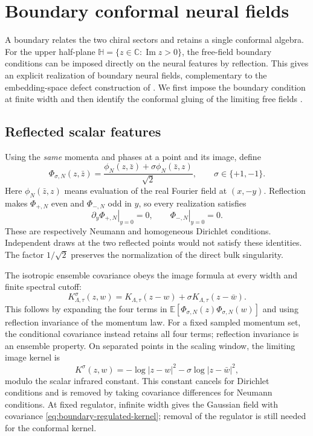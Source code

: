 \section{Boundary conformal neural fields}
\label{sec:boundary}

A boundary relates the two chiral sectors and retains a single conformal
algebra.  For the upper half-plane
$\mathbb H=\{z\in\mathbb C:\operatorname{Im}z>0\}$, the free-field
boundary conditions can be imposed directly on the neural features by
reflection.  This gives an explicit realization of boundary neural fields,
complementary to the embedding-space defect construction of
\cite{Capuozzo:2025ozt}.  We first impose the boundary condition at finite
width and then identify the conformal gluing of the limiting free fields
\cite{Cardy:2004hm}.

\subsection{Reflected scalar features}

Using the \emph{same} momenta and phases at a point and its image, define
\begin{equation}
\Phi_{\sigma,N}(z,\bar z)
=\frac{\phi_N(z,\bar z)+\sigma\phi_N(\bar z,z)}{\sqrt2},
\qquad \sigma\in\{+1,-1\}.
\label{eq:boundary-scalar-features}
\end{equation}
Here $\phi_N(\bar z,z)$ means evaluation of the real Fourier field at
$(x,-y)$.  Reflection makes $\Phi_{+,N}$ even and $\Phi_{-,N}$ odd in
$y$, so every realization satisfies
\begin{equation}
\left.\partial_y\Phi_{+,N}\right|_{y=0}=0,
\qquad
\left.\Phi_{-,N}\right|_{y=0}=0.
\label{eq:boundary-exact-bcs}
\end{equation}
These are respectively Neumann and homogeneous Dirichlet conditions.
Independent draws at the two reflected points would not satisfy these
identities.  The factor $1/\sqrt2$ preserves the normalization of the
direct bulk singularity.

The isotropic ensemble covariance obeys the image formula at every width
and finite spectral cutoff:
\begin{equation}
K^\sigma_{\Lambda,\tau}(z,w)
=K_{\Lambda,\tau}(z-w)
+\sigma K_{\Lambda,\tau}(z-\bar w).
\label{eq:boundary-regulated-kernel}
\end{equation}
This follows by expanding the four terms in
$\mathbb E[\Phi_{\sigma,N}(z)\Phi_{\sigma,N}(w)]$ and using reflection
invariance of the momentum law.  For a fixed sampled momentum set, the
conditional covariance instead retains all four terms; reflection
invariance is an ensemble property.  On separated points in the scaling
window, the limiting image kernel is
\begin{equation}
K^\sigma(z,w)
=-\log|z-w|^2-\sigma\log|z-\bar w|^2,
\label{eq:boundary-log-kernel}
\end{equation}
modulo the scalar infrared constant.  This constant cancels for Dirichlet
conditions and is removed by taking covariance differences for Neumann
conditions.  At fixed regulator, infinite width gives the Gaussian field
with covariance \eqref{eq:boundary-regulated-kernel}; removal of the
regulator is still needed for the conformal kernel.

